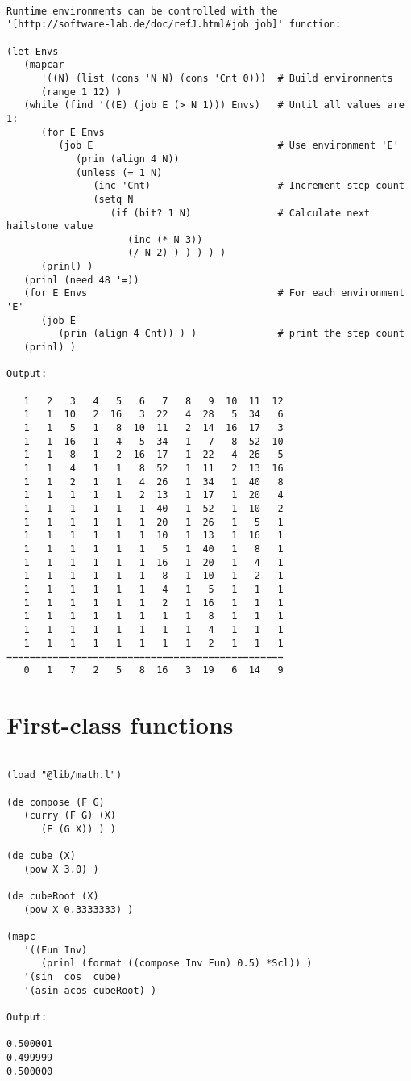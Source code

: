 \begin{verbatim}

Runtime environments can be controlled with the
'[http://software-lab.de/doc/refJ.html#job job]' function:

(let Envs
   (mapcar
      '((N) (list (cons 'N N) (cons 'Cnt 0)))  # Build environments
      (range 1 12) )
   (while (find '((E) (job E (> N 1))) Envs)   # Until all values are 1:
      (for E Envs
         (job E                                # Use environment 'E'
            (prin (align 4 N))
            (unless (= 1 N)
               (inc 'Cnt)                      # Increment step count
               (setq N
                  (if (bit? 1 N)               # Calculate next hailstone value
                     (inc (* N 3))
                     (/ N 2) ) ) ) ) )
      (prinl) )
   (prinl (need 48 '=))
   (for E Envs                                 # For each environment 'E'
      (job E
         (prin (align 4 Cnt)) ) )              # print the step count
   (prinl) )

Output:

   1   2   3   4   5   6   7   8   9  10  11  12
   1   1  10   2  16   3  22   4  28   5  34   6
   1   1   5   1   8  10  11   2  14  16  17   3
   1   1  16   1   4   5  34   1   7   8  52  10
   1   1   8   1   2  16  17   1  22   4  26   5
   1   1   4   1   1   8  52   1  11   2  13  16
   1   1   2   1   1   4  26   1  34   1  40   8
   1   1   1   1   1   2  13   1  17   1  20   4
   1   1   1   1   1   1  40   1  52   1  10   2
   1   1   1   1   1   1  20   1  26   1   5   1
   1   1   1   1   1   1  10   1  13   1  16   1
   1   1   1   1   1   1   5   1  40   1   8   1
   1   1   1   1   1   1  16   1  20   1   4   1
   1   1   1   1   1   1   8   1  10   1   2   1
   1   1   1   1   1   1   4   1   5   1   1   1
   1   1   1   1   1   1   2   1  16   1   1   1
   1   1   1   1   1   1   1   1   8   1   1   1
   1   1   1   1   1   1   1   1   4   1   1   1
   1   1   1   1   1   1   1   1   2   1   1   1
================================================
   0   1   7   2   5   8  16   3  19   6  14   9

\end{verbatim}

\section*{First-class functions}

\begin{verbatim}

(load "@lib/math.l")

(de compose (F G)
   (curry (F G) (X)
      (F (G X)) ) )

(de cube (X)
   (pow X 3.0) )

(de cubeRoot (X)
   (pow X 0.3333333) )

(mapc
   '((Fun Inv)
      (prinl (format ((compose Inv Fun) 0.5) *Scl)) )
   '(sin  cos  cube)
   '(asin acos cubeRoot) )

Output:

0.500001
0.499999
0.500000

\end{verbatim}

